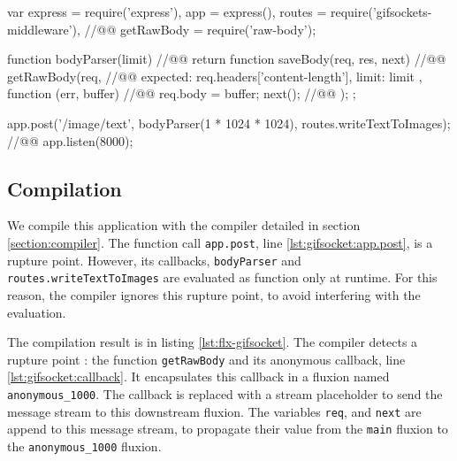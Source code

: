 
\begin{code}[js, caption={Simplified version of gifsockets-server},label={lst:gifsocket}]
var express = require('express'),
    app = express(),
    routes = require('gifsockets-middleware'), //@\label{lst:gifsocket:gif-mw}@
    getRawBody = require('raw-body');

function bodyParser(limit) { //@\label{lst:gifsocket:bodyParser}@
  return function saveBody(req, res, next) { //@\label{lst:gifsocket:saveBody}@
    getRawBody(req, { //@\label{lst:gifsocket:getRawBody}@
      expected: req.headers['content-length'],
      limit: limit
    }, function (err, buffer) { //@\label{lst:gifsocket:callback}@
      req.body = buffer;
      next(); //@\label{lst:gifsocket:next}@
    });
  };
}

app.post('/image/text', bodyParser(1 * 1024 * 1024), routes.writeTextToImages); //@\label{lst:gifsocket:app.post}@
app.listen(8000);
\end{code}


\subsection{Compilation}

We compile this application with the compiler detailed in section \ref{section:compiler}.
The function call \texttt{app.post}, line \ref{lst:gifsocket:app.post}, is a rupture point.
However, its callbacks, \texttt{bodyParser} and \texttt{routes.write\-Text\-To\-Images} are evaluated as function only at runtime.
For this reason, the compiler ignores this rupture point, to avoid interfering with the evaluation.

The compilation result is in listing \ref{lst:flx-gifsocket}.
The compiler detects a rupture point : the function \texttt{getRawBody} and its anonymous callback, line \ref{lst:gifsocket:callback}.
It encapsulates this callback in a fluxion named \texttt{anonymous\-\_1000}.
The callback is replaced with a stream placeholder to send the message stream to this downstream fluxion.
The variables \texttt{req}, and \texttt{next} are append to this message stream, to propagate their value from the \texttt{main} fluxion to the \texttt{anonymous\-\_1000} fluxion.

